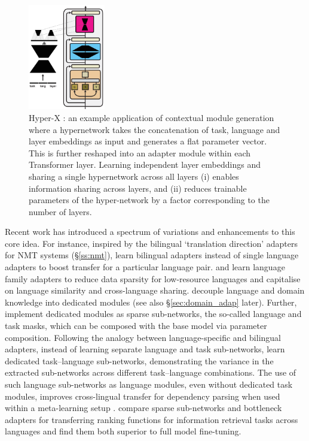 \documentclass[10pt]{article} %
\begin{document}
\begin{figure}
  \begin{center}
    \includegraphics[width=0.3\textwidth]{img/hyperx.pdf}
  \end{center}
  \caption{Hyper-X \citep{Ustun:2022hyperx}: an example application of contextual module generation where a hypernetwork takes the concatenation of task, language and layer embeddings as input and generates a flat parameter vector. This is further reshaped into an adapter module within each Transformer layer. Learning independent layer embeddings and sharing a single hypernetwork across all layers \citep{Ansell2021MADG} (i) enables information sharing across layers, and (ii) reduces trainable parameters of the hyper-network by a factor corresponding to the number of layers.}
  \label{fig:app_hyperx}
\end{figure}

Recent work has introduced a spectrum of variations and enhancements to this core idea. For instance, inspired by the bilingual `translation direction' adapters for NMT systems (\S\ref{ss:nmt}), \cite{Parovic2022BADX} learn bilingual adapters instead of single language adapters to boost transfer for a particular language pair. \cite{Faisal:2022arxiv} and \cite{Chronopolou:2022arxiv} learn language family adapters to reduce data sparsity for low-resource languages and capitalise on language similarity and cross-language sharing. \cite{Stickland2021MultilingualDomainAdapt} decouple language and domain knowledge into dedicated modules (see also \S\ref{sec:domain_adap} later).  
Further, \cite{ansell2021composable} implement dedicated modules as sparse sub-networks, the so-called language and task masks, which can be composed with the base model via parameter composition. Following the analogy between language-specific and bilingual adapters, instead of learning separate language and task sub-networks, \cite{Foroutan2022Discovering} learn dedicated task--language sub-networks, demonstrating the variance in the extracted sub-networks across different task--language combinations. The use of such language sub-networks as language modules, even without dedicated task modules, improves cross-lingual transfer for dependency parsing when used within a meta-learning setup \citep{Choenni:2022arxiv}. \citet{litschko-etal-2022-parameter} compare sparse sub-networks and bottleneck adapters for transferring ranking functions for information retrieval tasks across languages and find them both superior to full model fine-tuning.
\end{document}
